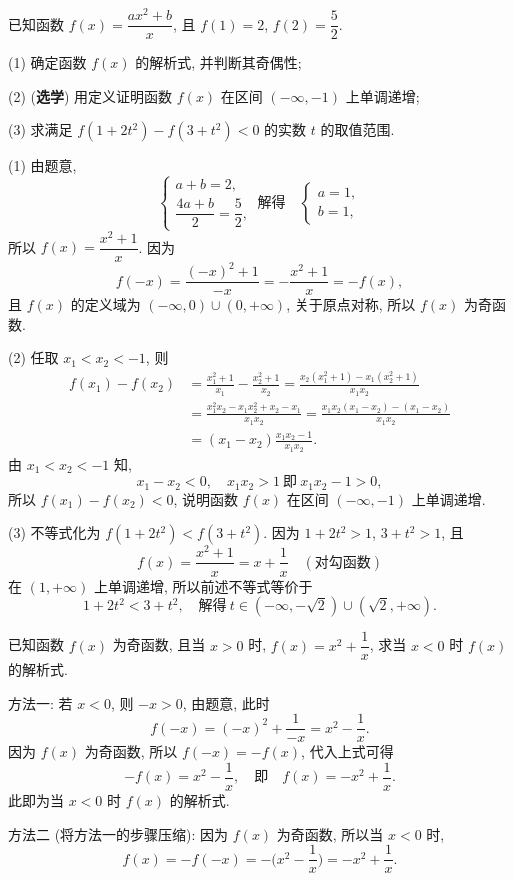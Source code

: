 \begin{example}
    已知函数 $f(x)=\dfrac{ax^2+b}x$, 且 $f(1)=2$, $f(2)=\dfrac52$.
    
    (1) 确定函数 $f(x)$ 的解析式, 并判断其奇偶性;
    
    (2) ({\bfseries 选学}) 用定义证明函数 $f(x)$ 在区间 $(-\infty,-1)$ 上单调递增;
    
    (3) 求满足 $f(1+2t^2)- f(3+t^2)<0$ 的实数 $t$ 的取值范围.
\end{example}
\begin{solution}
    (1) 由题意,
    \[\left\{\!\!\begin{array}{l}
        a+b=2,\\
        \dfrac{4a+b}2= \dfrac52,
       \end{array}\right.\ \text{解得}\quad
       \left\{\!\!\begin{array}{l}
        a=1,\\
        b=1,
       \end{array}\right.\]
    所以 $f(x)=\dfrac{x^2+1}x$. 因为
    \[f(-x)= \frac{(-x)^2+1}{-x}
        = -\frac{x^2+1}x= -f(x),\]
    且 $f(x)$ 的定义域为 $(-\infty,0)\cup (0,+\infty)$, 关于原点对称, 所以 $f(x)$ 为奇函数.
    
    (2) 任取 $x_1<x_2<-1$, 则
    \[\begin{aligned}
        f(x_1)-f(x_2)
        &= \frac{x_1^2+1}{x_1}- \frac{x_2^2+1}{x_2}
         = \frac{x_2(x_1^2+1)- x_1(x_2^2+1)}{x_1x_2}\\
        &= \frac{x_1^2 x_2- x_1 x_2^2+x_2- x_1}{x_1x_2}
         = \frac{x_1 x_2(x_1- x_2)- (x_1- x_2)}{x_1x_2}\\
        &= (x_1- x_2)\frac{x_1 x_2- 1}{x_1x_2}.
        \end{aligned}\]
    由 $x_1<x_2<-1$ 知,
    \[x_1- x_2<0,\quad x_1 x_2> 1\ \text{即}\ x_1 x_2- 1>0,\]
    所以 $f(x_1)-f(x_2)<0$, 说明函数 $f(x)$ 在区间 $(-\infty,-1)$ 上单调递增.
    
    (3) 不等式化为 $f(1+2t^2)< f(3+t^2)$. 因为 $1+2t^2>1$, $3+t^2>1$, 且
    \[f(x)= \dfrac{x^2+1}x= x+\dfrac1x\quad (\text{对勾函数})\]
    在 $(1,+\infty)$ 上单调递增, 所以前述不等式等价于 
    \[1+2t^2<3+t^2,\quad \text{解得}\ 
        t\in(-\infty,-\sqrt2)\cup(\sqrt2,+\infty).\]    
\end{solution}

\begin{example}\label{exa:201206-1300}
    已知函数 $f(x)$ 为奇函数, 且当 $x>0$ 时, $f(x)= x^2+\dfrac1x$, 求当 $x<0$ 时 $f(x)$ 的解析式.
\end{example}
\begin{solution}
    方法一: 若 $x<0$, 则 $-x>0$, 由题意, 此时 
    \[f(-x)= (-x)^2+\frac1{-x}= x^2-\frac1x.\]
    因为 $f(x)$ 为奇函数, 所以 $f(-x)= -f(x)$, 代入上式可得
    \[-f(x)= x^2-\frac1x,\quad\text{即}\quad f(x)=-x^2+\frac1x.\]
    此即为当 $x<0$ 时 $f(x)$ 的解析式.
    
    方法二 (将方法一的步骤压缩): 因为 $f(x)$ 为奇函数, 所以当 $x<0$ 时, 
    \[f(x)= -f(-x)= -\biggl(x^2-\frac1x\biggr)= -x^2+\frac1x.\]
\end{solution}

